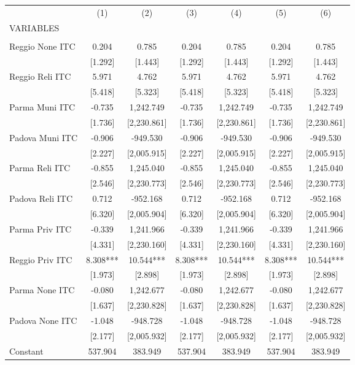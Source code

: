 \begin{tabular}{lcccccc} \hline
 & (1) & (2) & (3) & (4) & (5) & (6) \\
VARIABLES &  &  &  &  &  &  \\ \hline
 &  &  &  &  &  &  \\
Reggio None ITC & 0.204 & 0.785 & 0.204 & 0.785 & 0.204 & 0.785 \\
 & [1.292] & [1.443] & [1.292] & [1.443] & [1.292] & [1.443] \\
Reggio Reli ITC & 5.971 & 4.762 & 5.971 & 4.762 & 5.971 & 4.762 \\
 & [5.418] & [5.323] & [5.418] & [5.323] & [5.418] & [5.323] \\
Parma Muni ITC & -0.735 & 1,242.749 & -0.735 & 1,242.749 & -0.735 & 1,242.749 \\
 & [1.736] & [2,230.861] & [1.736] & [2,230.861] & [1.736] & [2,230.861] \\
Padova Muni ITC & -0.906 & -949.530 & -0.906 & -949.530 & -0.906 & -949.530 \\
 & [2.227] & [2,005.915] & [2.227] & [2,005.915] & [2.227] & [2,005.915] \\
Parma Reli ITC & -0.855 & 1,245.040 & -0.855 & 1,245.040 & -0.855 & 1,245.040 \\
 & [2.546] & [2,230.773] & [2.546] & [2,230.773] & [2.546] & [2,230.773] \\
Padova Reli ITC & 0.712 & -952.168 & 0.712 & -952.168 & 0.712 & -952.168 \\
 & [6.320] & [2,005.904] & [6.320] & [2,005.904] & [6.320] & [2,005.904] \\
Parma Priv ITC & -0.339 & 1,241.966 & -0.339 & 1,241.966 & -0.339 & 1,241.966 \\
 & [4.331] & [2,230.160] & [4.331] & [2,230.160] & [4.331] & [2,230.160] \\
Reggio Priv ITC & 8.308*** & 10.544*** & 8.308*** & 10.544*** & 8.308*** & 10.544*** \\
 & [1.973] & [2.898] & [1.973] & [2.898] & [1.973] & [2.898] \\
Parma None ITC & -0.080 & 1,242.677 & -0.080 & 1,242.677 & -0.080 & 1,242.677 \\
 & [1.637] & [2,230.828] & [1.637] & [2,230.828] & [1.637] & [2,230.828] \\
Padova None ITC & -1.048 & -948.728 & -1.048 & -948.728 & -1.048 & -948.728 \\
 & [2.177] & [2,005.932] & [2.177] & [2,005.932] & [2.177] & [2,005.932] \\
Constant & 537.904 & 383.949 & 537.904 & 383.949 & 537.904 & 383.949 \\

\end{tabular}
